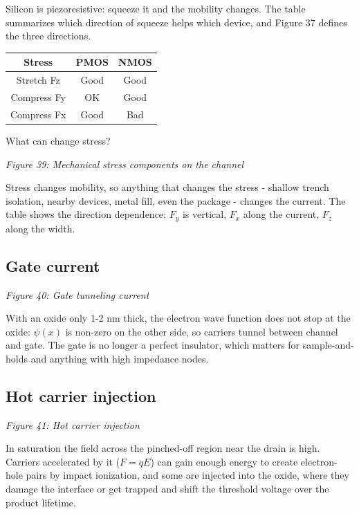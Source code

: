 Silicon is piezoresistive: squeeze it and the mobility changes. The
table summarizes which direction of squeeze helps which device, and
Figure 37 defines the three directions.

\begin{longtable}[]{@{}ccc@{}}
\toprule\noalign{}
Stress & PMOS & NMOS \\
\midrule\noalign{}
\endhead
\bottomrule\noalign{}
\endlastfoot
Stretch Fz & Good & Good \\
Compress Fy & OK & Good \\
Compress Fx & Good & Bad \\
\end{longtable}

What can change stress?


{
\centering
{}
}

\emph{Figure 39: Mechanical stress components on the channel}

Stress changes mobility, so anything that changes the stress - shallow
trench isolation, nearby devices, metal fill, even the package - changes
the current. The table shows the direction dependence: \(F_y\) is
vertical, \(F_x\) along the current, \(F_z\) along the width.

\subsection{Gate current}\label{gate-current}


{
\centering
{}
}

\emph{Figure 40: Gate tunneling current}

With an oxide only 1-2 nm thick, the electron wave function does not
stop at the oxide: \(\psi(x)\) is non-zero on the other side, so
carriers tunnel between channel and gate. The gate is no longer a
perfect insulator, which matters for sample-and-holds and anything with
high impedance nodes.

\subsection{Hot carrier injection}\label{hot-carrier-injection}


{
\centering
{}
}

\emph{Figure 41: Hot carrier injection}

In saturation the field across the pinched-off region near the drain is
high. Carriers accelerated by it (\(F = qE\)) can gain enough energy to
create electron-hole pairs by impact ionization, and some are injected
into the oxide, where they damage the interface or get trapped and shift
the threshold voltage over the product lifetime.

